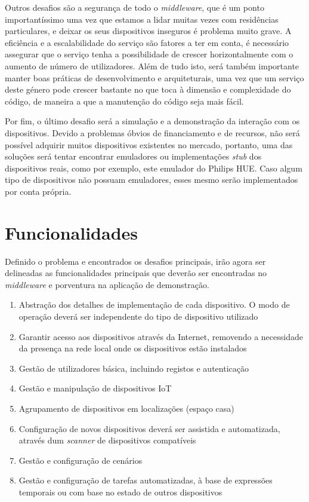 Outros desafios são a segurança de todo o \textit{middleware}, que é um ponto importantíssimo uma vez que estamos a lidar muitas vezes com residências particulares, e deixar os seus dispositivos inseguros é problema muito grave. A eficiência e a escalabilidade do serviço são fatores a ter em conta, é necessário assegurar que o serviço tenha a possibilidade de crescer horizontalmente com o aumento de número de utilizadores. Além de tudo isto, será também importante manter boas práticas de desenvolvimento e arquiteturais, uma vez que um serviço deste género pode crescer bastante no que toca à dimensão e complexidade do código, de maneira a que a manutenção do código seja mais fácil.

Por fim, o último desafio será a simulação e a demonstração da interação com os dispositivos. Devido a problemas óbvios de financiamento e de recursos, não será possível adquirir muitos dispositivos existentes no mercado, portanto, uma das soluções será tentar encontrar emuladores ou implementações \textit{stub} dos dispositivos reais, como por exemplo, este \cite{hueemulator} emulador do Philips HUE. Caso algum tipo de dispositivos não possuam emuladores, esses mesmo serão implementados por conta própria.

\section{Funcionalidades}
\label{sec:funcionalidades}

Definido o problema e encontrados os desafios principais, irão agora ser delineadas as funcionalidades principais que deverão ser encontradas no \textit{middleware} e porventura na aplicação de demonstração.

\begin{enumerate}
    \item Abstração dos detalhes de implementação de cada dispositivo. O modo de operação deverá ser independente do tipo de dispositivo utilizado
    \item Garantir acesso aos dispositivos através da Internet, removendo a necessidade da presença na rede local onde os dispositivos estão instalados
    \item Gestão de utilizadores básica, incluindo registos e autenticação
    \item Gestão e manipulação de dispositivos IoT
    \item Agrupamento de dispositivos em localizações (espaço casa)
    \item Configuração de novos dispositivos deverá ser assistida e automatizada, através dum \textit{scanner} de dispositivos compatíveis
    \item Gestão e configuração de cenários
    \item Gestão e configuração de tarefas automatizadas, à base de expressões temporais ou com base no estado de outros dispositivos
\end{enumerate}
